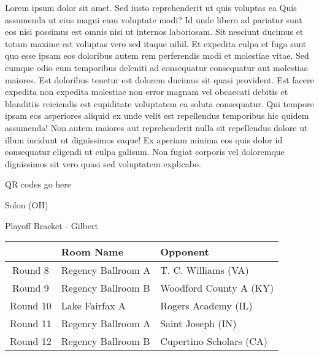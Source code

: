 \documentclass{article}%
\begin{document}
\vspace*{8pt}%
\linebreak%
\newline%
\newline%
Lorem ipsum dolor sit amet. Sed iusto reprehenderit ut quis voluptas ea Quis assumenda ut eius magni eum voluptate modi? Id unde libero ad pariatur sunt eos nisi possimus est omnis nisi ut internos laboriosam. Sit nesciunt ducimus et totam maxime est voluptas vero sed itaque nihil. Et expedita culpa et fuga sunt quo esse ipsam eos doloribus autem rem perferendis modi et molestiae vitae.\newline%
\newline%
Sed cumque odio eum temporibus deleniti ad consequatur consequatur aut molestias maiores. Est doloribus tenetur est dolorem ducimus sit quasi provident. Est facere expedita non expedita molestiae non error magnam vel obcaecati debitis et blanditiis reiciendis est cupiditate voluptatem ea soluta consequatur. Qui tempore ipsam eos asperiores aliquid ex unde velit est repellendus temporibus hic quidem assumenda!\newline%
\newline%
Non autem maiores aut reprehenderit nulla sit repellendus dolore ut illum incidunt ut dignissimos eaque! Ex aperiam minima eos quis dolor id consequatur eligendi ut culpa galisum. Non fugiat corporis vel doloremque dignissimos sit vero quasi sed voluptatem explicabo.\newline%
\newline%
%
\vspace*{30pt}%
\begin{center}%
\begin{Huge}%
QR codes go here%
\end{Huge}%
\end{center}%
\newpage%
\begin{center}%
\begin{Huge}%
Solon (OH)%
\end{Huge}%
\vspace*{8pt}%
\linebreak%
\begin{Large}%
Playoff Bracket {-} Gilbert%
\end{Large}%
\end{center}%
%
\begin{tabularx}{\textwidth}{|c|Y|Y|}%
\hline%
&Room Name&Opponent\\%
\hline%
Round 8&Regency Ballroom A&T. C. Williams (VA)\\%
Round 9&Regency Ballroom B&Woodford County A (KY)\\%
Round 10&Lake Fairfax A&Rogers Academy (IL)\\%
Round 11&Regency Ballroom A&Saint Joseph (IN)\\%
Round 12&Regency Ballroom B&Cupertino Scholars (CA)\\%
\hline%
\end{tabularx}%
\end{document}

